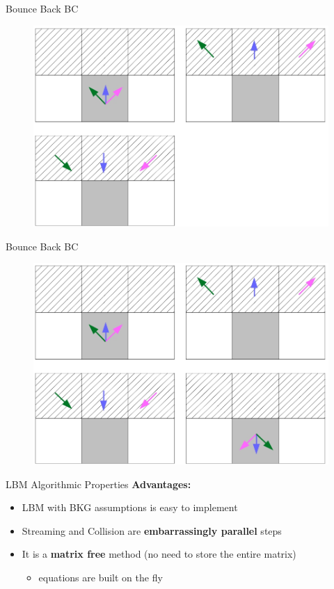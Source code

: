 \documentclass[9pt]{beamer}
\newcommand{\emphasize}[1]{\textbf{\color{red} #1 } }
\begin{document}
\begin{frame}[t]{Bounce Back BC}
\begin{figure}
\includegraphics[scale=0.3]{images/bounce-back-bc-3.jpg}
\centering
\end{figure}
\end{frame}

\begin{frame}[t]{Bounce Back BC}
\begin{figure}
\includegraphics[scale=0.3]{images/bounce-back-bc-4.jpg}
\centering
\end{figure}
\end{frame}

\begin{frame}[t]{LBM Algorithmic Properties}
\emphasize{Advantages:}
\begin{itemize}
\item LBM with BKG assumptions is easy to implement
\item Streaming and Collision are \textbf{embarrassingly parallel} steps
\item It is a \textbf{matrix free} method (no need to store the entire matrix)
\begin{itemize}
	\item equations are built on the fly
\end{itemize}

\end{itemize}

\end{frame}
\end{document}

